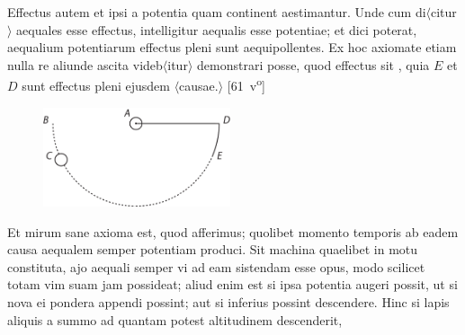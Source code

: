Effectus\protect{} autem et ipsi a potentia\protect{} quam continent aestimantur.
Unde cum di$\displaystyle\langle$citur$\displaystyle\rangle$
aequales esse effectus\protect{}, intelligitur aequalis esse potentiae;
et dici poterat, aequalium potentiarum\protect{}
effectus pleni\protect{} sunt aequipollentes\protect{}.
Ex hoc axiomate\protect{} etiam nulla re aliunde ascita videb$\displaystyle\langle$itur$\displaystyle\rangle$
demonstrari posse, quod effectus sit
,
quia $\displaystyle E$ et $\displaystyle D$ sunt effectus pleni\protect{} ejusdem $\displaystyle\langle$causae.$\displaystyle\rangle$
[61~v\textsuperscript{o}]
\pend
\newpage
\count{}
\pstart
\begin{figure}
\vspace{-4mm}\includegraphics[trim = 0mm -3mm -5mm 0mm, clip, width=0.49\textwidth]{images/LH037,04_061v-d1.pdf}\\
\noindent
{}%
\end{figure}
Et mirum sane axioma\protect{} est, quod afferimus;
quolibet momento temporis ab eadem causa\protect{}
aequalem semper potentiam\protect{} produci.
Sit machina\protect{} quaelibet in motu constituta,
ajo aequali semper vi ad eam sistendam esse opus,
modo scilicet totam vim suam jam possideat;
aliud enim est si ipsa potentia\protect{} augeri possit,
ut si nova ei pondera\protect{} appendi possint;
aut si inferius possint descendere.
Hinc si lapis aliquis a summo ad quantam potest altitudinem descenderit,
